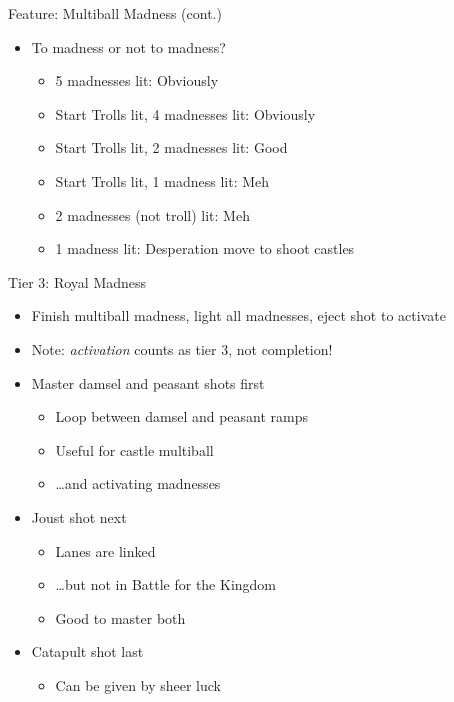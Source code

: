 \documentclass{beamer}
\begin{document}
\begin{frame}{Feature: Multiball Madness (cont.)}
\begin{itemize}
	\item To madness or not to madness?
	\begin{itemize}
		\item 5 madnesses lit: Obviously
		\item Start Trolls lit, 4 madnesses lit: Obviously
		\item Start Trolls lit, 2 madnesses lit: Good
		\item Start Trolls lit, 1 madness lit: Meh
		\item 2 madnesses (not troll) lit: Meh
		\item 1 madness lit: Desperation move to shoot castles
	\end{itemize}
\end{itemize}
\end{frame}

\begin{frame}{Tier 3: Royal Madness}
\begin{itemize}
	\item Finish multiball madness, light all madnesses, eject shot to activate
	\item Note: \emph{activation} counts as tier 3, not completion!
	\item Master damsel and peasant shots first
	\begin{itemize}
		\item Loop between damsel and peasant ramps
		\item Useful for castle multiball
		\item \ldots and activating madnesses
	\end{itemize}
	\item Joust shot next
	\begin{itemize}
		\item Lanes are linked
		\item \ldots but not in Battle for the Kingdom
		\item Good to master both
	\end{itemize}
	\item Catapult shot last
	\begin{itemize}
		\item Can be given by sheer luck
	\end{itemize}
\end{itemize}
\end{frame}
\end{document}
